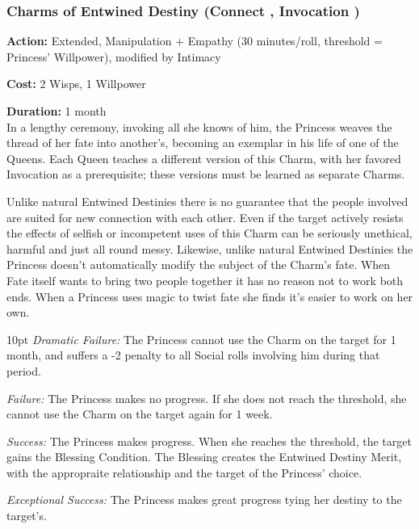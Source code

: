 \subsubsection*{Charms of Entwined Destiny (Connect \textbullet\textbullet\textbullet\textbullet, Invocation \textbullet\textbullet\textbullet)}

\noindent \textbf{Action:} Extended, Manipulation + Empathy (30 minutes/roll, threshold = Princess' Willpower), modified by Intimacy

\noindent \textbf{Cost:} 2 Wisps, 1 Willpower

\noindent \textbf{Duration:} 1 month \\

\noindent In a lengthy ceremony, invoking all she knows of him, the Princess weaves the thread of her fate into another's, becoming an exemplar in his life of one of the Queens. Each Queen teaches a different version of this Charm, with her favored Invocation as a prerequisite; these versions must be learned as separate Charms.

Unlike natural Entwined Destinies there is no guarantee that the people involved are suited for new connection with each other. Even if the target actively resists the effects of selfish or incompetent uses of this Charm can be seriously unethical, harmful and just all round messy. Likewise, unlike natural Entwined Destinies the Princess doesn't automatically modify the subject of the Charm's fate. When Fate itself wants to bring two people together it has no reason not to work both ends. When a Princess uses magic to twist fate she finds it's easier to work on her own.

       \begin{myindentpar}{10pt}  \emph{Dramatic Failure:} The Princess cannot use the Charm on the target for 1 month, and suffers a -2 penalty to all Social rolls involving him during that period.

        \emph{Failure:} The Princess makes no progress. If she does not reach the threshold, she cannot use the Charm on the target again for 1 week.

        \emph{Success:} The Princess makes progress. When she reaches the threshold, the target gains the Blessing Condition. The Blessing creates the Entwined Destiny Merit, with the appropraite relationship and the target of the Princess' choice. 

        \emph{Exceptional Success:} The Princess makes great progress tying her destiny to the target's.\end{myindentpar}

